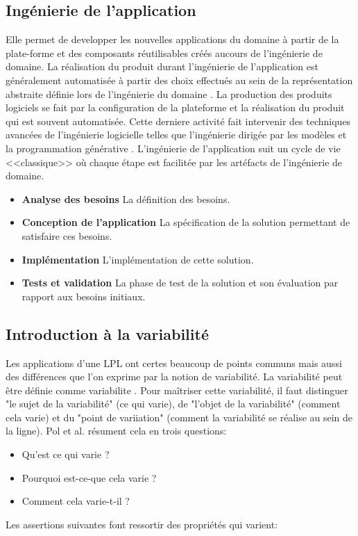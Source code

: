 \subsection{Ingénierie de l’application}
Elle permet de developper les nouvelles applications du domaine à partir de la plate-forme et des composants réutilisables créés aucours de l'ingénierie de domaine. La réalisation du produit durant l’ingénierie de l’application est généralement automatisée à partir des choix effectués au sein de la représentation abstraite définie lors de l’ingénierie du domaine \cite{Awais2011}. La production des produits logiciels se fait par la configuration de la plateforme et la réalisation du produit qui est souvent automatisée. Cette derniere activité fait intervenir des techniques avancées de l'ingénierie logicielle telles que l’ingénierie dirigée par les modèles et la programmation générative \cite{Urli2015}. L'ingénierie de l'application suit un cycle de vie <<classique>> où chaque étape est facilitée par les artéfacts de l'ingénierie de domaine.
\begin{itemize}
	\item \textbf{Analyse des besoins} La définition des besoins.
	\item \textbf{Conception de l'application} La spécification de la solution permettant de satisfaire ces
besoins.
	\item \textbf{Implémentation} L’implémentation de cette solution.
	\item \textbf{Tests et validation} La phase de test de la solution et son évaluation par
rapport aux besoins initiaux.
\end{itemize}
\subsection{Introduction à la variabilité}
Les applications d'une LPL ont certes beaucoup de points communs mais aussi des différences que l'on exprime par la notion de variabilité. La variabilité peut être définie comme \glsdesc{variabilite} \cite{Hugo2013}. Pour maîtriser cette variabilité, il faut distinguer "le sujet de la variabilité" (ce qui varie), de "l'objet de la variabilité" (comment cela varie) et du "point de variiation" (comment la variabilité se réalise au sein de la ligne). Pol et al. \cite{Klaus2005} résument cela en trois questions:

\begin{itemize}
	\item  Qu'est ce qui varie ?
	\item Pourquoi est-ce-que cela varie ?
	\item Comment cela varie-t-il ?
\end{itemize}
Les assertions suivantes font ressortir des propriétés qui varient: 

